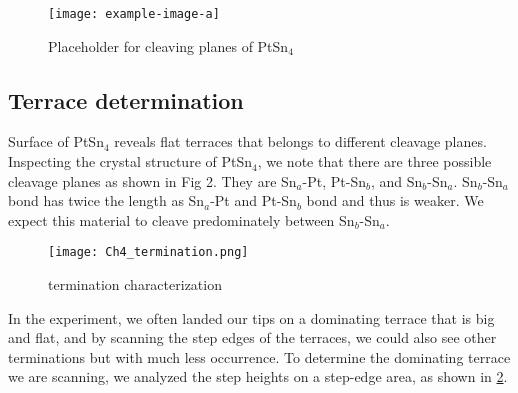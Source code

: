 \begin{figure}
	\centering
	\texttt{[image: example-image-a]} %
	\caption{Placeholder for cleaving planes of PtSn$_4$}
	\label{fig:ch4_cleavingplane}
\end{figure}


\subsection{Terrace determination}
\par Surface of PtSn$_4$ reveals flat terraces that belongs to different cleavage planes. Inspecting the crystal structure of PtSn$_4$, we note that there are three possible cleavage planes as shown in Fig 2. They are Sn$_a$-Pt, Pt-Sn$_b$, and Sn$_b$-Sn$_a$. Sn$_b$-Sn$_a$ bond has twice the length as Sn$_a$-Pt and Pt-Sn$_b$ bond and thus is weaker. We expect this material to cleave predominately between Sn$_b$-Sn$_a$. 

\begin{figure}
	\centering
	\texttt{[image: Ch4\_termination.png]}
	\caption{termination characterization}
	\label{fig:ch4_termination}
\end{figure}

\par In the experiment, we often landed our tips on a dominating terrace that is big and flat, and by scanning the step edges of the terraces, we could also see other terminations but with much less occurrence. To determine the dominating terrace we are scanning, we analyzed the step heights on a step-edge area, as shown in \ref{fig:ch4_termination}. 

